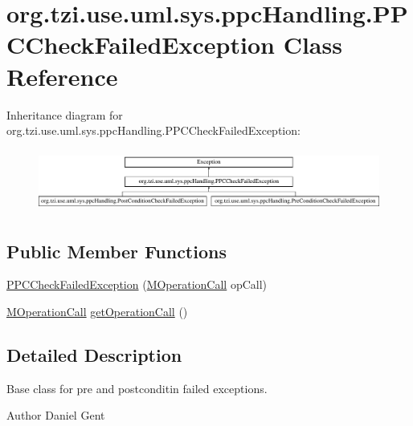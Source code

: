 \hypertarget{classorg_1_1tzi_1_1use_1_1uml_1_1sys_1_1ppc_handling_1_1_p_p_c_check_failed_exception}{\section{org.\-tzi.\-use.\-uml.\-sys.\-ppc\-Handling.\-P\-P\-C\-Check\-Failed\-Exception Class Reference}
\label{classorg_1_1tzi_1_1use_1_1uml_1_1sys_1_1ppc_handling_1_1_p_p_c_check_failed_exception}
}
Inheritance diagram for org.\-tzi.\-use.\-uml.\-sys.\-ppc\-Handling.\-P\-P\-C\-Check\-Failed\-Exception\-:\begin{figure}[H]
\begin{center}
\leavevmode
\includegraphics[height=2.063882cm]{classorg_1_1tzi_1_1use_1_1uml_1_1sys_1_1ppc_handling_1_1_p_p_c_check_failed_exception}
\end{center}
\end{figure}
\subsection*{Public Member Functions}
\begin{DoxyCompactItemize}
\item 
\hyperlink{classorg_1_1tzi_1_1use_1_1uml_1_1sys_1_1ppc_handling_1_1_p_p_c_check_failed_exception_a8590a0f661df843fb8aea03f788f800c}{P\-P\-C\-Check\-Failed\-Exception} (\hyperlink{classorg_1_1tzi_1_1use_1_1uml_1_1sys_1_1_m_operation_call}{M\-Operation\-Call} op\-Call)
\item 
\hyperlink{classorg_1_1tzi_1_1use_1_1uml_1_1sys_1_1_m_operation_call}{M\-Operation\-Call} \hyperlink{classorg_1_1tzi_1_1use_1_1uml_1_1sys_1_1ppc_handling_1_1_p_p_c_check_failed_exception_a2f5ba1106ed191e9b45c61a4f30572f2}{get\-Operation\-Call} ()
\end{DoxyCompactItemize}


\subsection{Detailed Description}
Base class for pre and postconditin failed exceptions. \begin{DoxyAuthor}{Author}
Daniel Gent 
\end{DoxyAuthor}


